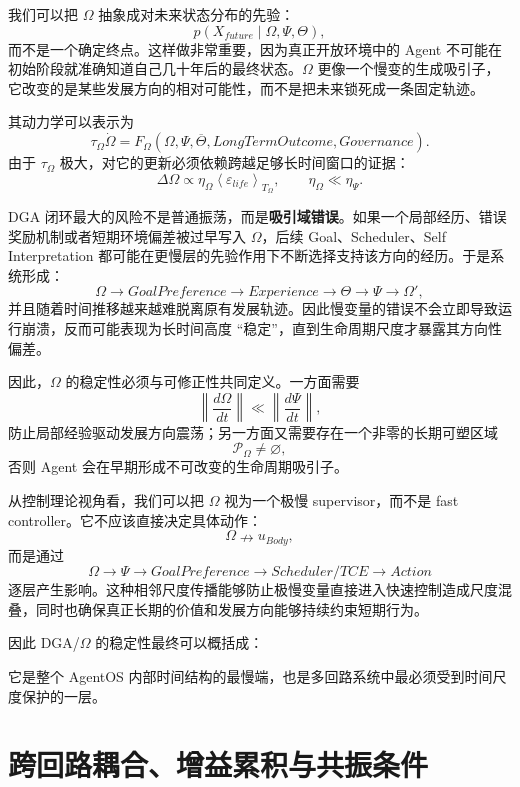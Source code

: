 我们可以把 $\Omega$ 抽象成对未来状态分布的先验：
\[
p
\left(
X_{future}\mid\Omega,\Psi,\Theta
\right),
\]
而不是一个确定终点。这样做非常重要，因为真正开放环境中的 Agent 不可能在初始阶段就准确知道自己几十年后的最终状态。$\Omega$ 更像一个慢变的生成吸引子，它改变的是某些发展方向的相对可能性，而不是把未来锁死成一条固定轨迹。

其动力学可以表示为
\[
\tau_\Omega\dot\Omega
=
F_\Omega
\left(
\Omega,
\Psi,
\overline{\Theta},
LongTermOutcome,
Governance
\right).
\]
由于 $\tau_\Omega$ 极大，对它的更新必须依赖跨越足够长时间窗口的证据：
\[
\Delta\Omega
\propto
\eta_\Omega
\left\langle
\varepsilon_{life}
\right\rangle_{T_\Omega},
\qquad
\eta_\Omega
\ll
\eta_\Psi.
\]

DGA 闭环最大的风险不是普通振荡，而是\textbf{吸引域错误}。如果一个局部经历、错误奖励机制或者短期环境偏差被过早写入 $\Omega$，后续 Goal、Scheduler、Self Interpretation 都可能在更慢层的先验作用下不断选择支持该方向的经历。于是系统形成：
\[
\Omega
\rightarrow
GoalPreference
\rightarrow
Experience
\rightarrow
\Theta
\rightarrow
\Psi
\rightarrow
\Omega',
\]
并且随着时间推移越来越难脱离原有发展轨迹。因此慢变量的错误不会立即导致运行崩溃，反而可能表现为长时间高度 ``稳定''，直到生命周期尺度才暴露其方向性偏差。

因此，$\Omega$ 的稳定性必须与可修正性共同定义。一方面需要
\[
\left\|
\frac{d\Omega}{dt}
\right\|
\ll
\left\|
\frac{d\Psi}{dt}
\right\|,
\]
防止局部经验驱动发展方向震荡；另一方面又需要存在一个非零的长期可塑区域
\[
\mathcal P_\Omega
\neq
\varnothing,
\]
否则 Agent 会在早期形成不可改变的生命周期吸引子。

从控制理论视角看，我们可以把 $\Omega$ 视为一个极慢 supervisor，而不是 fast controller。它不应该直接决定具体动作：
\[
\Omega
\nrightarrow
u_{Body},
\]
而是通过
\[
\Omega
\rightarrow
\Psi
\rightarrow
GoalPreference
\rightarrow
Scheduler/TCE
\rightarrow
Action
\]
逐层产生影响。这种相邻尺度传播能够防止极慢变量直接进入快速控制造成尺度混叠，同时也确保真正长期的价值和发展方向能够持续约束短期行为。

因此 DGA/$\Omega$ 的稳定性最终可以概括成：
\begin{statementbox}
\centering
{}
\end{statementbox}
它是整个 AgentOS 内部时间结构的最慢端，也是多回路系统中最必须受到时间尺度保护的一层。

\section{跨回路耦合、增益累积与共振条件}

